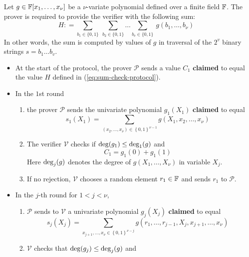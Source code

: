 \documentclass{article}
\begin{document}
\begin{boxx1} \label{def:sum-check-protocol}
Let $g \in \mathbb{F}[x_1, \dots, x_{\nu}]$ be a $\nu$-variate polynomial defined over a finite field $\mathbb{F}$. The prover is required to provide the verifier with the following sum:
\begin{equation} \label{eq:sum-check-protocol}
H : = \sum_{b_1 \in \{0, 1\}} \:  \sum_{b_2 \in \{0, 1 \}} \dots  \sum_{b_v \in \{0, 1 \}} \: g(b_1, \dots, b_{\nu})
\end{equation}
In other words, the sum is computed by values of $g$ in traversal of the $2^{v}$ binary strings $s = b_1 \dots b_{v}$.

\begin{itemize}
\item At the start of the protocol, the prover $\mathcal{P}$ sends a value $C_1$ \textbf{claimed} to equal the value $H$ defined in (\ref{eq:sum-check-protocol}). 
\item In the $1$st round 
\begin{enumerate}
\item\label{item:3} the prover $\mathcal{P}$ sends the univariate polynomial $g_1(X_1)$ \textbf{claimed} to equal
\begin{equation*}
s_1(X_1) = \sum_{(x_2, \dots, x_{\nu}) \in \left\{ 0, 1 \right\}^{\nu - 1}}  g(X_1, x_2, \dots, x_{\nu})
\end{equation*}
\item\label{item:4} The verifier $\mathcal{V}$ checks if $\operatorname{deg}(g_1) \leq \operatorname{deg}_1(g)$ and 
\begin{equation*}
C_1 = g_1(0) + g_1(1)
\end{equation*}
Here $\operatorname{deg}_j(g)$ denotes the degree of $g(X_1, \dots, X_{\nu})$ in variable $X_j$.
\item\label{item:5} If no rejection, $\mathcal{V}$ chooses a random element $r_1 \in \mathbb{F}$ and sends $r_1$ to $\mathcal{P}$. 
\end{enumerate}
\item In the $j$-th round for $1 < j < \nu$, 
\begin{enumerate}
\item\label{item:6} $\mathcal{P}$ sends to $\mathcal{V}$ a univariate polynomial $g_j(X_j)$ \textbf{claimed} to equal 
\begin{equation*}
s_j(X_j) = \sum_{x_{j+1}, \dots, x_{\nu} \in \left\{ 0, 1 \right\}^{\nu - j}}  g(r_1, \dots, r_{j-1}, X_j, x_{j+1}, \dots, x_{\nu})
\end{equation*}
\item\label{item:7} $\mathcal{V}$ checks that $\operatorname{deg}(g_j) \leq \operatorname{deg}_j(g)$ and 

\end{enumerate}
\end{itemize}
\end{boxx1}
\end{document}
